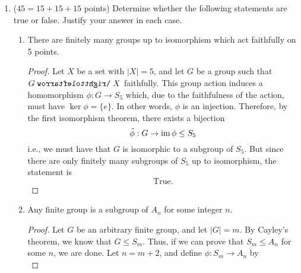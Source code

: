 \documentclass[../psets.tex]{subfiles}
\begin{document}
\begin{enumerate}
\begin{proof}
        \begin{align*}
            g\cdot x &= y\\
            &= h\cdot y\\
            &= h\cdot(g\cdot x)\\
            &= hg\cdot x\\
            &= gh\cdot x\\
            &= g\cdot(h\cdot x)
        \end{align*}
        It follows by the faithfulness of the action that $h\cdot x=x$, i.e., $h\in\Stab(x)$. Having shown that an arbitrary element of one stabilizer is necessarily in another, we know that all stabilizers are equal, and thus have the desired result.
    \end{proof}
    \item ($45=15+15+15$ points) Determine whether the following statements are true or false. Justify your answer in each case.
    \begin{enumerate}
        \item There are finitely many groups up to isomorphism which act faithfully on 5 points.
        \begin{proof}
            Let $X$ be a set with $|X|=5$, and let $G$ be a group such that $G\acts X$ faithfully. This group action induces a homomorphism $\phi:G\to S_5$ which, due to the faithfulness of the action, must have $\ker\phi=\{e\}$. In other words, $\phi$ is an injection. Therefore, by the first isomorphism theorem, there exists a bijection
            \begin{equation*}
                \tilde{\phi}:G\to\operatorname{im}\phi \leq S_5
            \end{equation*}
            i.e., we must have that $G$ is isomorphic to a subgroup of $S_5$. But since there are only finitely many subgroups of $S_5$ up to isomorphism, the statement is
            \begin{equation*}
                \boxed{\text{True.}}
            \end{equation*}
        \end{proof}
        \item Any finite group is a subgroup of $A_n$ for some integer $n$.
        \begin{proof}
            Let $G$ be an arbitrary finite group, and let $|G|=m$. By Cayley's theorem, we know that $G\leq S_m$. Thus, if we can prove that $S_m\leq A_n$ for some $n$, we are done. Let $n=m+2$, and define $\phi:S_m\to A_n$ by
            \begin{equation*}

\end{equation*}
\end{proof}
\end{enumerate}
\end{enumerate}
\end{document}
